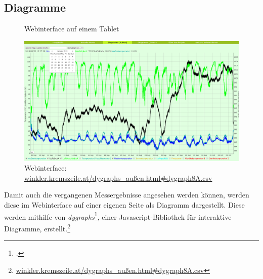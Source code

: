 \subsection{Diagramme}
\label{subsec:Diagramme}

\begin{figure}[h]
  \centering
  \caption{Webinterface auf einem Tablet}
  \label{fig:dygraphs_tablet}
\end{figure}

\begin{figure}[h]
  \centering
     \includegraphics[width=\textwidth]{figures/dygraphs.png}
  \caption[Webinterface]{Webinterface: \href{http://winkler.kremszeile.at/dygraphs\_au\%C3\%9Fen.html\#dygraph8A.csv}{winkler.kremszeile.at/dygraphs\_außen.html\#dygraph8A.csv}}
  \label{fig:dygraphs}
\end{figure}
Damit auch die vergangenen Messergebnisse angesehen werden können, werden diese im Webinterface auf einer eigenen Seite als Diagramm dargestellt. Diese werden mithilfe von \emph{dygraphs}\footcite{dygraphs}, einer \gls{Javascript}-Bibliothek für interaktive Diagramme, erstellt.\footnote{\href{http://winkler.kremszeile.at/dygraphs_au\%C3\%9Fen.html\#dygraph8A.csv}{winkler.kremszeile.at/dygraphs\_außen.html\#dygraph8A.csv}}

